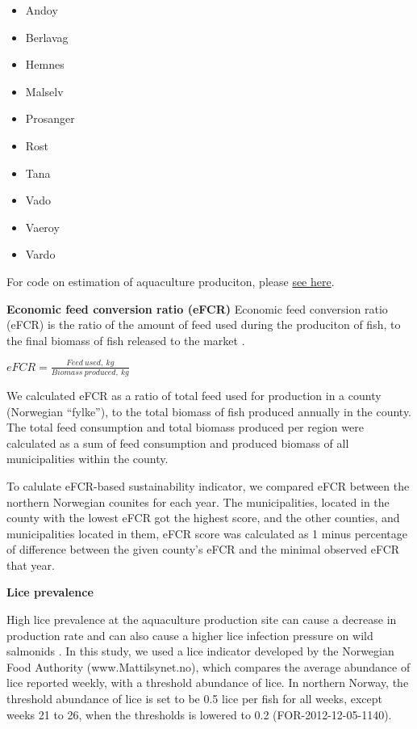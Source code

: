 \documentclass[
]{book}
\providecommand{\tightlist}{%
  \setlength{\itemsep}{0pt}\setlength{\parskip}{0pt}}
\begin{document}
\begin{itemize}
\tightlist
\item
  Andoy
\item
  Berlavag
\item
  Hemnes
\item
  Malselv
\item
  Prosanger
\item
  Rost
\item
  Tana
\item
  Vado
\item
  Vaeroy
\item
  Vardo
\end{itemize}

For code on estimation of aquaculture produciton, please
\href{https://ohi-norway.github.io/nor-prep/prep/food_provision/Mariculture/total_aquaculture_production_and_efcr_newdata_jan2020.html}{see here}.

\textbf{Economic feed conversion ratio (eFCR)}
Economic feed conversion ratio (eFCR) is the ratio of the amount of feed used during the produciton of fish, to the final biomass of fish released to the market \citep{boyd2007indicators}.

\(eFCR = \frac{Feed \ used,\ kg}{Biomass\ produced,\ kg}\)

We calculated eFCR as a ratio of total feed used for production in a county (Norwegian ``fylke''), to the total biomass of fish produced annually in the county. The total feed consumption and total biomass produced per region were calculated as a sum of feed consumption and produced biomass of all municipalities within the county.

To calulate eFCR-based sustainability indicator, we compared eFCR between the northern Norwegian counites for each year. The municipalities, located in the county with the lowest eFCR got the highest score, and the other counties, and municipalities located in them, eFCR score was calculated as 1 minus percentage of difference between the given county's eFCR and the minimal observed eFCR that year.

\textbf{Lice prevalence}

High lice prevalence at the aquaculture production site can cause a decrease in production rate and can also cause a higher lice infection pressure on wild salmonids \citep{bjorn2001salmon, nilsen2017vurdering}.
In this study, we used a lice indicator developed by the Norwegian Food Authority (www.Mattilsynet.no), which compares the average abundance of lice reported weekly, with a threshold abundance of lice. In northern Norway, the threshold abundance of lice is set to be 0.5 lice per fish for all weeks, except weeks 21 to 26, when the thresholds is lowered to 0.2 (FOR-2012-12-05-1140).
\end{document}
